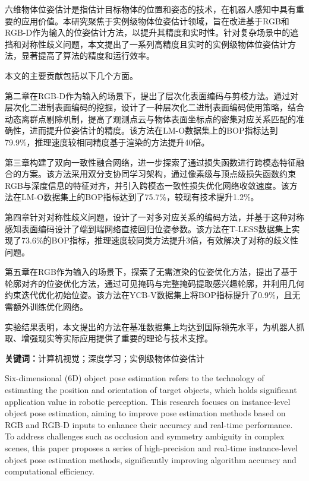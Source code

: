 \cleardoublepage
{}
\par 六维物体位姿估计是指估计目标物体的位置和姿态的技术，在机器人感知中具有重要的应用价值。本研究聚焦于实例级物体位姿估计领域，旨在改进基于RGB和RGB-D作为输入的位姿估计方法，以提升其精度和实时性。针对复杂场景中的遮挡和对称性歧义问题，本文提出了一系列高精度且实时的实例级物体位姿估计方法，显著提高了算法的精度和运行效率。
\par 本文的主要贡献包括以下几个方面。
\par 第二章在RGB-D作为输入的场景下，提出了层次化表面编码与剪枝方法。通过对层次化二进制表面编码的挖掘，设计了一种层次化二进制表面编码使用策略，结合动态离群点剔除机制，提高了观测点云与物体表面坐标点的密集对应关系匹配的准确性，进而提升位姿估计的精度。该方法在LM-O数据集上的BOP指标达到79.9\%，推理速度较相同精度基于渲染的方法提升40倍。
\par 第三章构建了双向一致性融合网络，进一步探索了通过损失函数进行跨模态特征融合的方案。该方法采用双分支协同学习架构，通过像素级与顶点级损失函数约束RGB与深度信息的特征对齐，并引入跨模态一致性损失优化网络收敛速度。该方法在LM-O数据集上的BOP指标达到了75.7\%，较现有技术提升1.2\%。
\par 第四章针对对称性歧义问题，设计了一对多对应关系的编码方法，并基于这种对称感知表面编码设计了端到端网络直接回归位姿参数。该方法在T-LESS数据集上实现了73.6\%的BOP指标，推理速度较同类方法提升3倍，有效解决了对称的歧义性问题。
\par 第五章在RGB作为输入的场景下，探索了无需渲染的位姿优化方法，提出了基于轮廓对齐的位姿优化方法，通过可见掩码与完整掩码提取感兴趣轮廓，并利用几何约束迭代优化初始位姿。该方法在YCB-V数据集上将BOP指标提升了0.9\%，且无需额外训练优化网络。
\par 实验结果表明，本文提出的方法在基准数据集上均达到国际领先水平，为机器人抓取、增强现实等实际应用提供了重要的理论与技术支撑。
\par \textbf{关键词：}计算机视觉；深度学习；实例级物体位姿估计
\cleardoublepage
{}
\par Six-dimensional (6D) object pose estimation refers to the technology of estimating the position and orientation of target objects, which holds significant application value in robotic perception. This research focuses on instance-level object pose estimation, aiming to improve pose estimation methods based on RGB and RGB-D inputs to enhance their accuracy and real-time performance. To address challenges such as occlusion and symmetry ambiguity in complex scenes, this paper proposes a series of high-precision and real-time instance-level object pose estimation methods, significantly improving algorithm accuracy and computational efficiency. 
